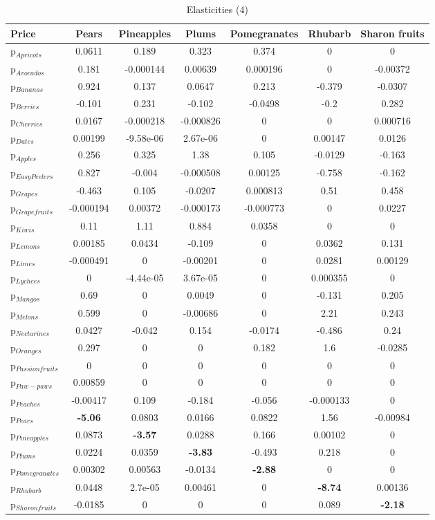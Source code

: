 \documentclass[11pt]{article}
\begin{document}
\begin{table}[h]
\caption{Elasticities (4)}
\label{table:elasticities 4}
\begin{center}
\begin{tabular}{lcccccc} \hline \hline
Price &Pears &Pineapples &Plums &Pomegranates &Rhubarb &Sharon fruits \\ \hline
p$_{Apricots}$ &0.0611 &0.189 &0.323 &0.374 &0 &0 \\
p$_{Avocados}$ &0.181 &-0.000144 &0.00639 &0.000196 &0 &-0.00372 \\
p$_{Bananas}$ &0.924 &0.137 &0.0647 &0.213 &-0.379 &-0.0307 \\
p$_{Berries}$ &-0.101 &0.231 &-0.102 &-0.0498 &-0.2 &0.282 \\
p$_{Cherries}$ &0.0167 &-0.000218 &-0.000826 &0 &0 &0.000716 \\
p$_{Dates}$ &0.00199 &-9.58e-06 &2.67e-06 &0 &0.00147 &0.0126 \\
p$_{Apples}$ &0.256 &0.325 &1.38 &0.105 &-0.0129 &-0.163 \\
p$_{Easy Peelers}$ &0.827 &-0.004 &-0.000508 &0.00125 &-0.758 &-0.162 \\
p$_{Grapes}$ &-0.463 &0.105 &-0.0207 &0.000813 &0.51 &0.458 \\
p$_{Grapefruits}$ &-0.000194 &0.00372 &-0.000173 &-0.000773 &0 &0.0227 \\
p$_{Kiwis}$ &0.11 &1.11 &0.884 &0.0358 &0 &0 \\
p$_{Lemons}$ &0.00185 &0.0434 &-0.109 &0 &0.0362 &0.131 \\
p$_{Limes}$ &-0.000491 &0 &-0.00201 &0 &0.0281 &0.00129 \\
p$_{Lychees}$ &0 &-4.44e-05 &3.67e-05 &0 &0.000355 &0 \\
p$_{Mangos}$ &0.69 &0 &0.0049 &0 &-0.131 &0.205 \\
p$_{Melons}$ &0.599 &0 &-0.00686 &0 &2.21 &0.243 \\
p$_{Nectarines}$ &0.0427 &-0.042 &0.154 &-0.0174 &-0.486 &0.24 \\
p$_{Oranges}$ &0.297 &0 &0 &0.182 &1.6 &-0.0285 \\
p$_{Passion fruits}$ &0 &0 &0 &0 &0 &0 \\
p$_{Paw-paws}$ &0.00859 &0 &0 &0 &0 &0 \\
p$_{Peaches}$ &-0.00417 &0.109 &-0.184 &-0.056 &-0.000133 &0 \\
p$_{Pears}$ &\textbf{-5.06} &0.0803 &0.0166 &0.0822 &1.56 &-0.00984 \\
p$_{Pineapples}$ &0.0873 &\textbf{-3.57} &0.0288 &0.166 &0.00102 &0 \\
p$_{Plums}$ &0.0224 &0.0359 &\textbf{-3.83} &-0.493 &0.218 &0 \\
p$_{Pomegranates}$ &0.00302 &0.00563 &-0.0134 &\textbf{-2.88} &0 &0 \\
p$_{Rhubarb}$ &0.0448 &2.7e-05 &0.00461 &0 &\textbf{-8.74} &0.00136 \\
p$_{Sharon fruits}$ &-0.0185 &0 &0 &0 &0.089 &\textbf{-2.18} \\
\end{tabular}
\end{center}
\end{table}
\end{document}
